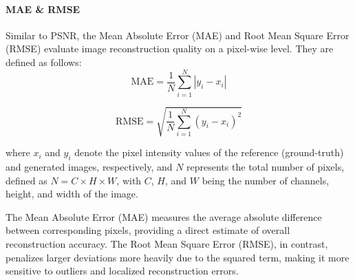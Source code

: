 \paragraph{MAE \& RMSE}
Similar to PSNR, the Mean Absolute Error (MAE) and Root Mean Square Error (RMSE) evaluate image reconstruction quality on a pixel-wise level. They are defined as follows:
\begin{equation}
\mathrm{MAE} = \frac{1}{N} \sum_{i=1}^{N} \left| y_i - x_i \right|
\end{equation}

\begin{equation}
\mathrm{RMSE} = \sqrt{\frac{1}{N} \sum_{i=1}^{N} \left( y_i - x_i \right)^2}
\end{equation}

where $x_i$ and $y_i$ denote the pixel intensity values of the reference (ground-truth) and generated images, respectively, and $N$ represents the total number of pixels, defined as $N = C \times H \times W$, with $C$, $H$, and $W$ being the number of channels, height, and width of the image.

The Mean Absolute Error (MAE) measures the average absolute difference between corresponding pixels, providing a direct estimate of overall reconstruction accuracy. The Root Mean Square Error (RMSE), in contrast, penalizes larger deviations more heavily due to the squared term, making it more sensitive to outliers and localized reconstruction errors.





